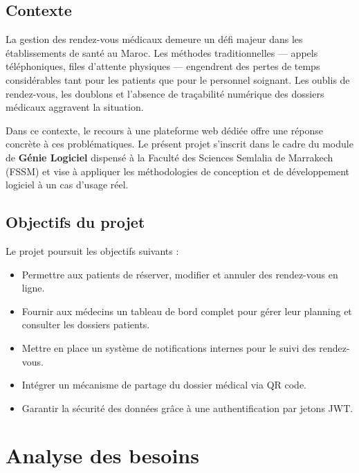 \documentclass[12pt, a4paper]{article}
\begin{document}
\subsection{Contexte}

La gestion des rendez-vous médicaux demeure un défi majeur dans les établissements de santé au Maroc. Les méthodes traditionnelles — appels téléphoniques, files d'attente physiques — engendrent des pertes de temps considérables tant pour les patients que pour le personnel soignant. Les oublis de rendez-vous, les doublons et l'absence de traçabilité numérique des dossiers médicaux aggravent la situation.

Dans ce contexte, le recours à une plateforme web dédiée offre une réponse concrète à ces problématiques. Le présent projet s'inscrit dans le cadre du module de \textbf{Génie Logiciel} dispensé à la Faculté des Sciences Semlalia de Marrakech (FSSM) et vise à appliquer les méthodologies de conception et de développement logiciel à un cas d'usage réel.

\subsection{Objectifs du projet}

Le projet poursuit les objectifs suivants :

\begin{itemize}[nosep]
  \item Permettre aux patients de réserver, modifier et annuler des rendez-vous en ligne.
  \item Fournir aux médecins un tableau de bord complet pour gérer leur planning et consulter les dossiers patients.
  \item Mettre en place un système de notifications internes pour le suivi des rendez-vous.
  \item Intégrer un mécanisme de partage du dossier médical via QR code.
  \item Garantir la sécurité des données grâce à une authentification par jetons JWT.
\end{itemize}

\section{Analyse des besoins}
\end{document}
